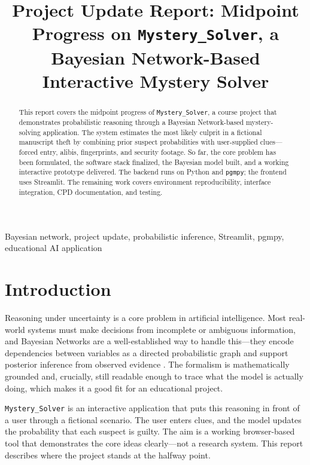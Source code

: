 \documentclass[conference]{IEEEtran}
\title{Project Update Report: Midpoint Progress on \texttt{Mystery\_Solver}, a Bayesian Network-Based Interactive Mystery Solver}
\author{\IEEEauthorblockN{Group 8}}
\begin{document}
\maketitle
\thispagestyle{IEEEtitlepagestyle}
\pagestyle{plain}

\begin{abstract}
This report covers the midpoint progress of \texttt{Mystery\_Solver}, a course project that demonstrates probabilistic reasoning through a Bayesian Network-based mystery-solving application. The system estimates the most likely culprit in a fictional manuscript theft by combining prior suspect probabilities with user-supplied clues---forced entry, alibis, fingerprints, and security footage. So far, the core problem has been formulated, the software stack finalized, the Bayesian model built, and a working interactive prototype delivered. The backend runs on Python and \texttt{pgmpy}; the frontend uses Streamlit. The remaining work covers environment reproducibility, interface integration, CPD documentation, and testing.
\end{abstract}

\begin{IEEEkeywords}
Bayesian network, project update, probabilistic inference, Streamlit, pgmpy, educational AI application
\end{IEEEkeywords}

\section{Introduction}
Reasoning under uncertainty is a core problem in artificial intelligence. Most real-world systems must make decisions from incomplete or ambiguous information, and Bayesian Networks are a well-established way to handle this---they encode dependencies between variables as a directed probabilistic graph and support posterior inference from observed evidence \cite{pearl1988}. The formalism is mathematically grounded and, crucially, still readable enough to trace what the model is actually doing, which makes it a good fit for an educational project.

\texttt{Mystery\_Solver} is an interactive application that puts this reasoning in front of a user through a fictional scenario. The user enters clues, and the model updates the probability that each suspect is guilty. The aim is a working browser-based tool that demonstrates the core ideas clearly---not a research system. This report describes where the project stands at the halfway point.
\end{document}
